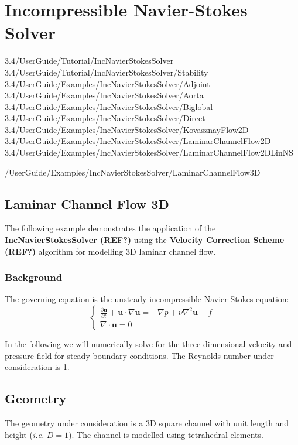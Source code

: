 \section{Incompressible Navier-Stokes Solver}

3.4/UserGuide/Tutorial/IncNavierStokesSolver
3.4/UserGuide/Tutorial/IncNavierStokesSolver/Stability
3.4/UserGuide/Examples/IncNavierStokesSolver/Adjoint
3.4/UserGuide/Examples/IncNavierStokesSolver/Aorta
3.4/UserGuide/Examples/IncNavierStokesSolver/Biglobal
3.4/UserGuide/Examples/IncNavierStokesSolver/Direct
3.4/UserGuide/Examples/IncNavierStokesSolver/KovasznayFlow2D
3.4/UserGuide/Examples/IncNavierStokesSolver/LaminarChannelFlow2D
3.4/UserGuide/Examples/IncNavierStokesSolver/LaminarChannelFlow2DLinNS

/UserGuide/Examples/IncNavierStokesSolver/LaminarChannelFlow3D
\subsection{Laminar Channel Flow 3D}
The following example demonstrates the application of the \textbf{IncNavierStokesSolver  (REF?)} using the \textbf{Velocity Correction Scheme (REF?)} algorithm for modelling 3D laminar channel flow.

\subsubsection{Background}
The governing equation is the unsteady incompressible Navier-Stokes equation:
\begin{equation}
\begin{cases}
\frac{\partial \textbf{u}}{\partial t} + \textbf{u} \cdot \nabla \textbf{u} = - \nabla p + \nu \nabla^2 \textbf{u} + f \\
\nabla \cdot \textbf{u} = 0
\end{cases}
\end{equation}

In the following we will numerically solve for the three dimensional velocity and pressure field for steady boundary conditions. The Reynolds number under consideration is 1.

\subsection{Geometry}
The geometry under consideration is a 3D square channel with unit length and height (\textit{i.e.} $D=1$). The channel is modelled using tetrahedral elements.


